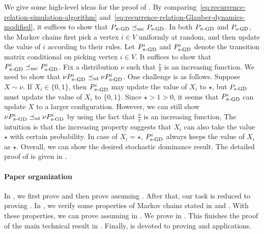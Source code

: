 \documentclass[11pt,a4paper]{article}
\newcommand{\mc}{\preceq_{\textnormal{mc}}}
\newcommand{\sd}{\preceq_{\textnormal{sd}}}
\newcommand{\psim}{P_{\textnormal{s-GD}}}
\theoremstyle{definition}
\begin{document}
We give some high-level ideas for the proof of . By comparing~\eqref{eq:recurrence-relation-simulation-algorithm} and~\eqref{eq:recurrence-relation-Glauber-dynamics-modified}, it suffices to show that $P_{\pi\textnormal{-GD}} \mc \psim$. In both $P_{\pi\textnormal{-GD}} $ and $\psim$, the Markov chains first pick a vertex $i \in V$ uniformly at random, and then update the value of $i$ according to their rules. Let $P_{\pi\textnormal{-GD}}^i$ and $\psim^i$ denote the transition matrix conditional on picking vertex $i \in V$. It suffices to show that $P_{\pi\textnormal{-GD}}^i \mc \psim^i$. Fix a distribution $\nu$ such that $\frac{\nu}{\pi}$ is an increasing function. We need to show that $\nu P_{\pi\textnormal{-GD}}^i \sd \nu \psim^i$. One challenge is as follows. Suppose $X \sim \nu$. If $X_i \in \{0,1\}$, then $P_{\pi\textnormal{-GD}}^i$ may update the value of $X_i$ to $\star$, but $\psim$ must update the value of $X_i$ to $\{0,1\}$. Since $\star > 1 > 0$, it seems that $P_{\pi\textnormal{-GD}}^i$ can update $X$ to a larger configuration. However, we can still show $\nu P_{\pi\textnormal{-GD}}^i \sd \nu \psim^i$ by using the fact that $\frac{\nu}{\pi}$ is an increasing function. The intuition is that the increasing property suggests that $X_i$ can also take the value $\star$ with certain probability. In case of $X_i = \star$, $\psim^i$ always keeps the value of $X_i$ as $\star$. Overall, we can show the desired stochastic dominance result. The detailed proof of  is given in .


\paragraph{Paper organization}
In , we first prove  and then prove  assuming . After that, our task is reduced to proving . 
In , we verify some properties of Markov chains stated in  and . With these properties, we can prove  assuming  in . We prove  in . This finishes the proof of the main technical result in . Finally,   is devoted to proving  and applications.
\end{document}
